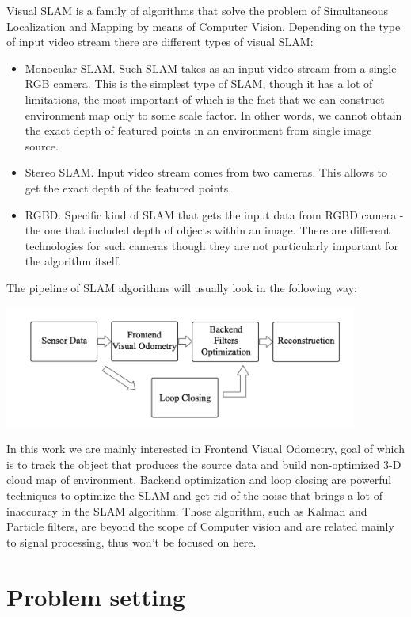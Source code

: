 Visual SLAM is a family of algorithms that solve the problem of Simultaneous Localization and Mapping by means of Computer Vision. Depending on the type of input video stream there are different types of visual SLAM:
\begin{itemize}
    \item Monocular SLAM. Such SLAM takes as an input video stream from a single RGB camera. This is the simplest type of SLAM, though it has a lot of limitations, the most important of which is the fact that we can construct environment map only to some scale factor. In other words, we cannot obtain the exact depth of featured points in an environment from single image source. 
    \item Stereo SLAM. Input video stream comes from two cameras. This allows to get the exact depth of the featured points.
    \item RGBD. Specific kind of SLAM that gets the input data from RGBD camera - the one that included depth of objects within an image. There are different technologies for such cameras though they are not particularly important for the algorithm itself.
\end{itemize}


The pipeline of SLAM algorithms will usually look in the following way:
\begin{center}
    \includegraphics[height=4cm]{pipeline.png}\\[1cm]
\end{center}

In this work we are mainly interested in Frontend Visual Odometry, goal of which is to track the object that produces the source data and build non-optimized 3-D cloud map of environment. Backend optimization and loop closing are powerful techniques to optimize the SLAM and get rid of the noise that brings a lot of inaccuracy in the SLAM algorithm. Those algorithm, such as Kalman and Particle filters, are beyond the scope of Computer vision and are related mainly to signal processing, thus won't be focused on here.

\section{Problem setting}

